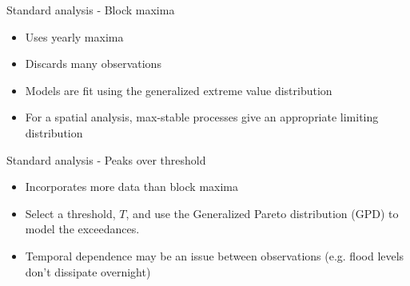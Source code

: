 \documentclass{beamer}
\begin{document}
\begin{frame}{Standard analysis - Block maxima}
  \begin{itemize} \setlength{\itemsep}{0.5em}
      \item Uses yearly maxima
      \item Discards many observations
      \item Models are fit using the generalized extreme value distribution
    \item For a spatial analysis, max-stable processes give an appropriate limiting distribution
  \end{itemize}
\end{frame}

\begin{frame}{Standard analysis - Peaks over threshold}
  \begin{itemize}  \setlength{\itemsep}{0.5em}
      \item Incorporates more data than block maxima
      \item Select a threshold, $T$, and use the Generalized Pareto distribution (GPD) to model the exceedances.
      \item Temporal dependence may be an issue between observations (e.g. flood levels don't dissipate overnight)
  \end{itemize}
\end{frame}

\end{document}
